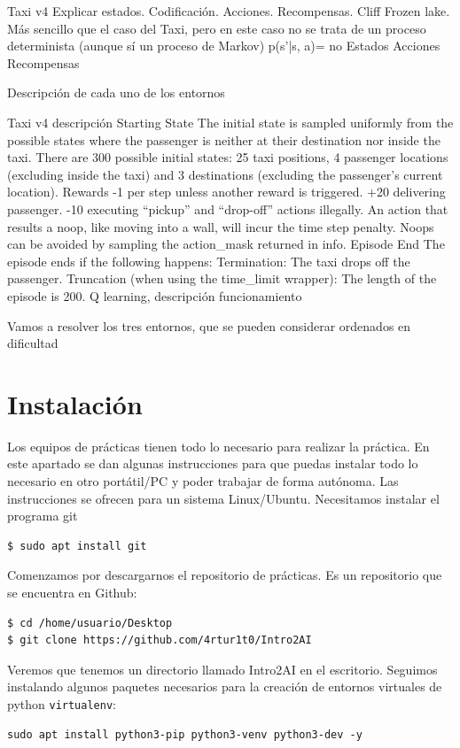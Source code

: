 \documentclass{article}
\begin{document}
\begin{itemize}
Taxi v4
Explicar estados. Codificación.
Acciones.
Recompensas.
Cliff
Frozen lake.
Más sencillo que el caso del Taxi, pero en este caso no se trata de un proceso determinista (aunque sí un proceso de Markov) p(s’|s, a)= no
Estados
Acciones
Recompensas

Descripción de cada uno de los entornos

Taxi v4 descripción
Starting State
The initial state is sampled uniformly from the possible states where the passenger is neither at their destination nor inside the taxi. There are 300 possible initial states: 25 taxi positions, 4 passenger locations (excluding inside the taxi) and 3 destinations (excluding the passenger’s current location).
Rewards
-1 per step unless another reward is triggered.
+20 delivering passenger.
-10 executing “pickup” and “drop-off” actions illegally.
An action that results a noop, like moving into a wall, will incur the time step penalty. Noops can be avoided by sampling the action_mask returned in info.
Episode End
The episode ends if the following happens:
Termination:
The taxi drops off the passenger.
Truncation (when using the time_limit wrapper):
The length of the episode is 200.
Q learning, descripción funcionamiento

Vamos a resolver los tres entornos, que se pueden considerar ordenados en dificultad


\section{Instalación}
Los equipos de prácticas tienen todo lo necesario para realizar la práctica. En este apartado se dan algunas instrucciones para que puedas instalar todo lo necesario en otro portátil/PC y poder trabajar de forma autónoma. Las instrucciones se ofrecen para un sistema Linux/Ubuntu. 
Necesitamos instalar el programa git
\begin{verbatim}
$ sudo apt install git
\end{verbatim}

Comenzamos por descargarnos el repositorio de prácticas. Es un repositorio que se encuentra en Github:
\begin{verbatim}
$ cd /home/usuario/Desktop
$ git clone https://github.com/4rtur1t0/Intro2AI
\end{verbatim}
Veremos que tenemos un directorio llamado Intro2AI en el escritorio. Seguimos instalando algunos paquetes necesarios para la creación de entornos virtuales de python \texttt{virtualenv}:
\begin{verbatim}
sudo apt install python3-pip python3-venv python3-dev -y 
\end{verbatim}


\end{itemize}
\end{document}
